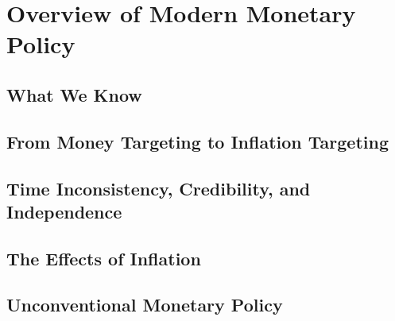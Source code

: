 \documentclass[11pt,a4paper,oneside]{book}
\begin{document}

\part{Overview of Modern Monetary Policy}
\chapter{What We Know}


\chapter{From Money Targeting to Inflation Targeting}


\chapter{Time Inconsistency, Credibility, and Independence}


\chapter{The Effects of Inflation}


\chapter{Unconventional Monetary Policy}
\end{document}
